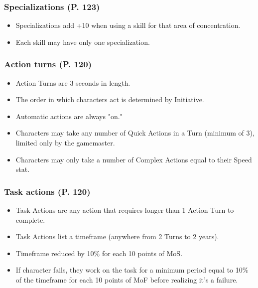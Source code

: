 \subsubsection{Specializations (P. 123)} 

\begin{itemize} \item Specializations add +10 when using a skill for that area of concentration. \item Each skill may have only one specialization. \end{itemize} 

\subsubsection{Action turns (P. 120)} 

\begin{itemize} \item Action Turns are 3 seconds in length. \item The order in which characters act is determined by Initiative. \item Automatic actions are always "on." \item Characters may take any number of Quick Actions in a Turn (minimum of 3), limited only by the gamemaster. \item Characters may only take a number of Complex Actions equal to their Speed stat. \end{itemize} 

\subsubsection{Task actions (P. 120)} 

\begin{itemize} \item Task Actions are any action that requires longer than 1 Action Turn to complete. \item Task Actions list a timeframe (anywhere from 2 Turns to 2 years). \item Timeframe reduced by 10\% for each 10 points of MoS. \item If character fails, they work on the task for a minimum period equal to 10\% of the timeframe for each 10 points of MoF before realizing it's a failure. \end{itemize} 



